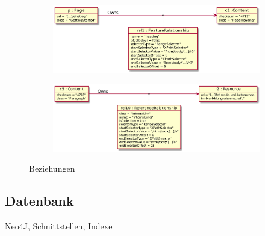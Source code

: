         \begin{figure}
            \centering
            \begin{subfigure}{\textwidth}
                \includegraphics[width=\textwidth]{../resources/db-data-model/example/p-c1.png}
            \end{subfigure}

            \begin{subfigure}{\textwidth}
                \includegraphics[width=\textwidth]{../resources/db-data-model/example/c5-r2.png}
            \end{subfigure}
            \caption{Beziehungen}
            \label{image:dbDataModelExampleRelationships}
        \end{figure}

    \subsection{Datenbank}
        Neo4J, Schnittstellen, Indexe